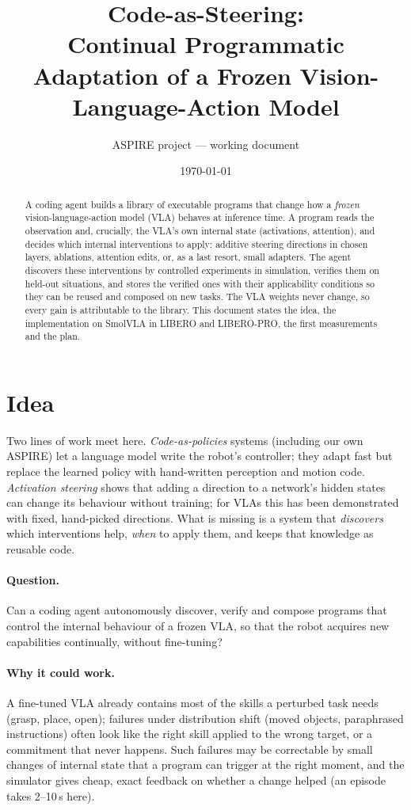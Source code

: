 \documentclass[11pt]{article}
\title{Code-as-Steering:\\ Continual Programmatic Adaptation of a Frozen Vision-Language-Action Model}
\author{ASPIRE project --- working document}
\date{\today}
\begin{document}
\maketitle

\begin{abstract}
A coding agent builds a library of executable programs that change how a \emph{frozen} vision-language-action model (VLA)
behaves at inference time. A program reads the observation and, crucially, the VLA's own internal state (activations,
attention), and decides which internal interventions to apply: additive steering directions in chosen layers, ablations,
attention edits, or, as a last resort, small adapters. The agent discovers these interventions by controlled experiments in
simulation, verifies them on held-out situations, and stores the verified ones with their applicability conditions so they
can be reused and composed on new tasks. The VLA weights never change, so every gain is attributable to the library. This
document states the idea, the implementation on SmolVLA in LIBERO and LIBERO-PRO, the first measurements and the plan.
\end{abstract}

\section{Idea}

Two lines of work meet here. \emph{Code-as-policies} systems (including our own ASPIRE) let a language model write the
robot's controller; they adapt fast but replace the learned policy with hand-written perception and motion code.
\emph{Activation steering} shows that adding a direction to a network's hidden states can change its behaviour without
training; for VLAs this has been demonstrated with fixed, hand-picked directions. What is missing is a system that
\emph{discovers} which interventions help, \emph{when} to apply them, and keeps that knowledge as reusable code.

\paragraph{Question.} Can a coding agent autonomously discover, verify and compose programs that control the internal
behaviour of a frozen VLA, so that the robot acquires new capabilities continually, without fine-tuning?

\paragraph{Why it could work.} A fine-tuned VLA already contains most of the skills a perturbed task needs (grasp, place,
open); failures under distribution shift (moved objects, paraphrased instructions) often look like the right skill
applied to the wrong target, or a commitment that never happens. Such failures may be correctable by small changes of
internal state that a program can trigger at the right moment, and the simulator gives cheap, exact feedback on whether
a change helped (an episode takes 2--10\,s here).
\end{document}

